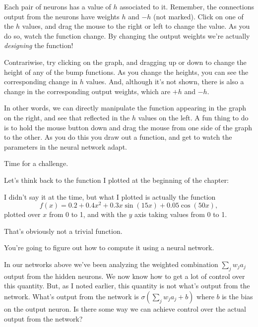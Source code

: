 \documentclass[a4paper,twoside,10pt]{book}
\begin{document}
Each pair of neurons has a value of $h$ associated to it. Remember, the connections output from the neurons have weights $h$ and $-h$ (not marked). Click on one of the $h$ values, and drag the mouse to the right or left to change the value. As you do so, watch the function change. By changing the output weights we're actually \textit{designing} the function!

Contrariwise, try clicking on the graph, and dragging up or down to change the height of any of the bump functions. As you change the heights, you can see the corresponding change in $h$ values. And, although it's not shown, there is also a change in the corresponding output weights, which are $+h$ and $-h$.

In other words, we can directly manipulate the function appearing in the graph on the right, and see that reflected in the $h$ values on the left. A fun thing to do is to hold the mouse button down and drag the mouse from one side of the graph to the other. As you do this you draw out a function, and get to watch the parameters in the neural network adapt.

Time for a challenge.

Let's think back to the function I plotted at the beginning of the chapter:
\begin{center} 
\end{center}
I didn't say it at the time, but what I plotted is actually the function
\begin{equation}
f(x)=0.2+0.4x^2+0.3x\sin(15x)+0.05\cos(50x),\tag{113}\label{eq:113}
\end{equation}
plotted over $x$ from 0 to 1, and with the $y$ axis taking values from 0 to 1.

That's obviously not a trivial function.

You're going to figure out how to compute it using a neural network.

In our networks above we've been analyzing the weighted combination $\sum_jw_ja_j$ output from the hidden neurons. We now know how to get a lot of control over this quantity. But, as I noted earlier, this quantity is not what's output from the network. What's output from the network is $\sigma\left(\sum_jw_ja_j+b\right)$ where $b$ is the bias on the output neuron. Is there some way we can achieve control over the actual output from the network?
\end{document}
